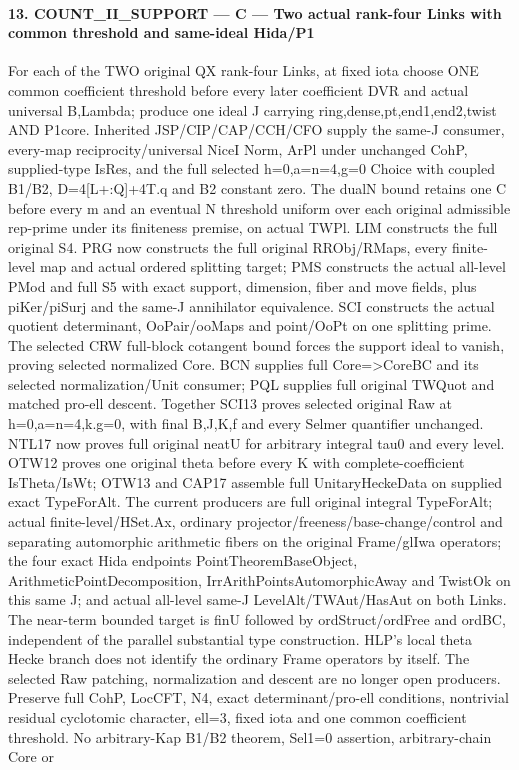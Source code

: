\paragraph{13. COUNT\_\allowbreak{}II\_\allowbreak{}SUPPORT — C — Two actual rank-four Links with common threshold and same-ideal Hida/\allowbreak{}P1}

For each of the TWO original QX rank-four Links, at fixed iota choose ONE common coefficient threshold before every later coefficient DVR and actual universal B,Lambda; produce one ideal J carrying ring,dense,pt,end1,end2,twist AND P1core. Inherited JSP/\allowbreak{}CIP/\allowbreak{}CAP/\allowbreak{}CCH/\allowbreak{}CFO supply the same-J consumer, every-map reciprocity/\allowbreak{}universal NiceI Norm, ArPl under unchanged CohP, supplied-type IsRes, and the full selected h=0,a=n=4,g=0 Choice with coupled B1/\allowbreak{}B2, D=4[L+:Q]+4T.q and B2 constant zero. The dualN bound retains one C before every m and an eventual N threshold uniform over each original admissible rep-prime under its finiteness premise, on actual TWPl. LIM constructs the full original S4. PRG now constructs the full original RRObj/\allowbreak{}RMaps, every finite-level map and actual ordered splitting target; PMS constructs the actual all-level PMod and full S5 with exact support, dimension, fiber and move fields, plus piKer/\allowbreak{}piSurj and the same-J annihilator equivalence. SCI constructs the actual quotient determinant, OoPair/\allowbreak{}ooMaps and point/\allowbreak{}OoPt on one splitting prime. The selected CRW full-block cotangent bound forces the support ideal to vanish, proving selected normalized Core. BCN supplies full Core=>CoreBC and its selected normalization/\allowbreak{}Unit consumer; PQL supplies full original TWQuot and matched pro-ell descent. Together SCI13 proves selected original Raw at h=0,a=n=4,k.g=0, with final B,J,K,f and every Selmer quantifier unchanged. NTL17 now proves full original neatU for arbitrary integral tau0 and every level. OTW12 proves one original theta before every K with complete-coefficient IsTheta/\allowbreak{}IsWt; OTW13 and CAP17 assemble full UnitaryHeckeData on supplied exact TypeForAlt. The current producers are full original integral TypeForAlt; actual finite-level/\allowbreak{}HSet.Ax, ordinary projector/\allowbreak{}freeness/\allowbreak{}base-change/\allowbreak{}control and separating automorphic arithmetic fibers on the original Frame/\allowbreak{}glIwa operators; the four exact Hida endpoints PointTheoremBaseObject, ArithmeticPointDecomposition, IrrArithPointsAutomorphicAway and TwistOk on this same J; and actual all-level same-J LevelAlt/\allowbreak{}TWAut/\allowbreak{}HasAut on both Links. The near-term bounded target is finU followed by ordStruct/\allowbreak{}ordFree and ordBC, independent of the parallel substantial type construction. HLP's local theta Hecke branch does not identify the ordinary Frame operators by itself. The selected Raw patching, normalization and descent are no longer open producers. Preserve full CohP, LocCFT, N4, exact determinant/\allowbreak{}pro-ell conditions, nontrivial residual cyclotomic character, ell=3, fixed iota and one common coefficient threshold. No arbitrary-Kap B1/\allowbreak{}B2 theorem, Sel1=0 assertion, arbitrary-chain Core or 